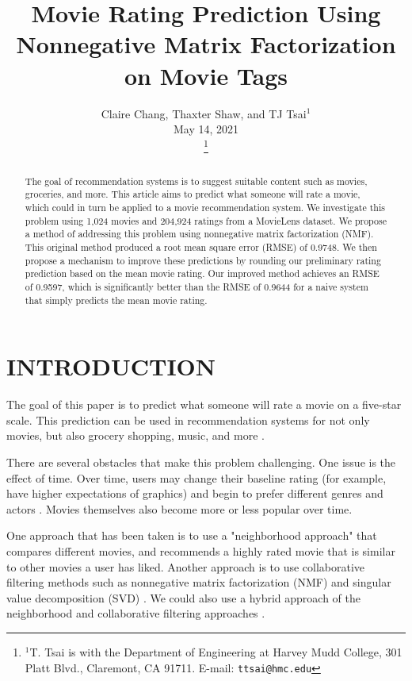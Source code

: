 \documentclass[letterpaper, 10 pt, conference]{ieeeconf}  %
\title{\LARGE \bf
Movie Rating Prediction Using Nonnegative Matrix Factorization on Movie Tags
}
\author{Claire Chang, Thaxter Shaw, and TJ Tsai$^{1}$%
\\ \vspace*{10pt} \normalsize  May 14, 2021

\thanks{$^{1}$T. Tsai is with the Department of Engineering at Harvey Mudd College,
301 Platt Blvd., Claremont, CA 91711. E-mail: {\tt\small ttsai@hmc.edu}}%
}
\begin{document}
\maketitle
\thispagestyle{empty}
\pagestyle{empty}


\begin{abstract}

The goal of recommendation systems is to suggest suitable content such as movies, groceries, and more. This article aims to predict what someone will rate a movie, which could in turn be applied to a movie recommendation system.
We investigate this problem using 1,024 movies and 204,924 ratings from a MovieLens dataset.
We propose a method of addressing this problem using nonnegative matrix factorization (NMF). This original method produced a root mean square error (RMSE) of 0.9748. We then propose a mechanism to improve these predictions by rounding our preliminary rating prediction based on the mean movie rating.
Our improved method achieves an RMSE of 0.9597, which is significantly better than the RMSE of 0.9644 for a naive system that simply predicts the mean movie rating.

\end{abstract}


\medbreak
\section{INTRODUCTION}

The goal of this paper is to predict what someone will rate a movie on a five-star scale.
This prediction can be used in recommendation systems for not only movies, but also grocery shopping, music, and more \cite{recsys}.

There are several obstacles that make this problem challenging. 
One issue is the effect of time. Over time, users may change their baseline rating (for example, have higher expectations of graphics) and begin to prefer different genres and actors \cite{netflix}.
Movies themselves also become more or less popular over time.

One approach that has been taken is to use a "neighborhood approach" that compares different movies, and recommends a highly rated movie that is similar to other movies a user has liked. 
Another approach is to use collaborative filtering methods such as nonnegative matrix factorization (NMF) and singular value decomposition (SVD) \cite{cf}. 
We could also use a hybrid approach of the neighborhood and collaborative filtering approaches \cite{hybrid}.
\end{document}
